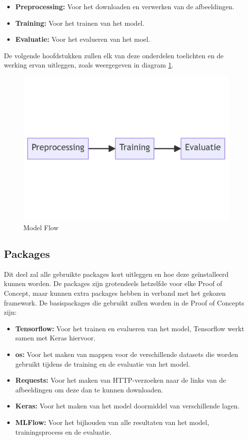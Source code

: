 \begin{itemize}
    \item \textbf{Preprocessing:} Voor het downloaden en verwerken van de afbeeldingen.
    \item \textbf{Training:} Voor het trainen van het model.
    \item \textbf{Evaluatie:} Voor het evalueren van het moel.
\end{itemize}

De volgende hoofdstukken zullen elk van deze onderdelen toelichten en de werking ervan uitleggen, zoals weergegeven in diagram \ref{fig:Model_Flow}.
\begin{figure}[htbp]
    \centering
    \includegraphics[width=0.9\linewidth]{graphics/Model_Diagram.PNG}
    \caption{Model Flow}
    \label{fig:Model_Flow}
\end{figure}
\subsection{Packages}
Dit deel zal alle gebruikte packages kort uitleggen en hoe deze geïnstalleerd kunnen worden. De packages zijn grotendeels hetzelfde voor elke Proof of Concept, maar kunnen extra packages hebben in verband met het gekozen framework.
De basispackages die gebruikt zullen worden in de Proof of Concepts zijn:
\begin{itemize}
    \item \textbf{Tensorflow:} Voor het trainen en evalueren van het model, Tensorflow werkt samen met Keras hiervoor.
    \item \textbf{os:} Voor het maken van mappen voor de verschillende datasets die worden gebruikt tijdens de training en de evaluatie van het model.
    \item \textbf{Requests:} Voor het maken van HTTP-verzoeken naar de links van de afbeeldingen om deze dan te kunnen downloaden.
    \item \textbf{Keras:} Voor het maken van het model doormiddel van verschillende lagen.
    \item \textbf{MLFlow:} Voor het bijhouden van alle resultaten van het model, trainingsprocess en de evaluatie.
\end{itemize}


